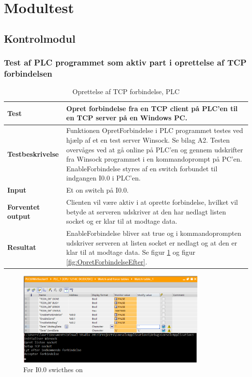
\section{Modultest}

\subsection{Kontrolmodul}

\subsubsection{Test af PLC programmet som aktiv part i oprettelse af TCP forbindelsen}
\begin{table}[H]
	\centering
	\begin{tabular}{ | m{} | m{}|} 
		\hline
		\textbf{Test}					&Opret forbindelse fra en TCP client på PLC'en til en TCP server på en Windows PC. \\ \hline
		\textbf{Testbeskrivelse}		&Funktionen OpretForbindelse i PLC programmet testes ved hjælp af et en test server Winsock. Se bilag A2. Testen overvåges ved at gå online på PLC'en og gennem udskrifter fra Winsock programmet i en kommandoprompt på PC'en. EnableForbindelse styres af en switch forbundet til indgangen I0.0 i PLC'en.\\ \hline
		\textbf{Input}					& Et on switch på I0.0.\\ \hline
		\textbf{Forventet output}		&Clienten vil være aktiv i at oprette forbindelse, hvilket vil betyde at serveren udskriver at den har nedlagt listen socket og er klar til at modtage data.\\ \hline
		\textbf{Resultat}				&EnableForbindelse bliver sat true og i kommandoprompten udskriver serveren at listen socket er nedlagt og at den er klar til at modtage data. Se figur \ref{fig:OpretForbindelseFoer} og figur \ref{fig:OpretForbindelseEfter}.   \\ \hline
	\end{tabular}
	\caption{Oprettelse af TCP forbindelse, PLC} 
	\label{tab:PLCopretForbindelse}
\end{table}

\begin{figure}[H] %
	\centering
	\includegraphics[width=0.85\textwidth]{Test/ModultestStyringsenhed/OpretForbindelseFoer}
	\caption{Før I0.0 swicthes on}
	\label{fig:OpretForbindelseFoer}
\end{figure}

